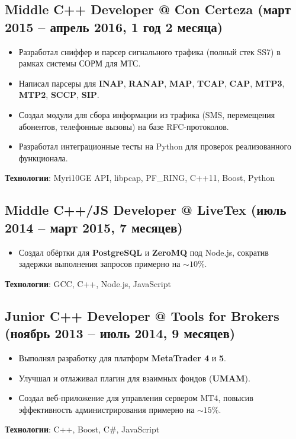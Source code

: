 \documentclass[a4paper,12pt]{article}
\begin{document}
\subsection*{Middle C++ Developer @ Con Certeza \quad (март 2015 – апрель 2016, 1 год 2 месяца)}
\begin{itemize}[leftmargin=15pt]
    \item Разработал сниффер и парсер сигнального трафика (полный стек SS7) в рамках системы СОРМ для МТС.
    \item Написал парсеры для \textbf{INAP}, \textbf{RANAP}, \textbf{MAP}, \textbf{TCAP}, \textbf{CAP}, \textbf{MTP3}, \textbf{MTP2}, \textbf{SCCP}, \textbf{SIP}.
    \item Создал модули для сбора информации из трафика (SMS, перемещения абонентов, телефонные вызовы) на базе RFC-протоколов.
    \item Разработал интеграционные тесты на Python для проверок реализованного функционала.
\end{itemize}

\textbf{Технологии}: Myri10GE API, libpcap, PF\_RING, C++11, Boost, Python

\vspace{3mm}

\subsection*{Middle C++/JS Developer @ LiveTex \quad (июль 2014 – март 2015, 7 месяцев)}
\begin{itemize}[leftmargin=15pt]
    \item Создал обёртки для \textbf{PostgreSQL} и \textbf{ZeroMQ} под Node.js, сократив задержки выполнения запросов примерно на \(\sim 10\%\).
\end{itemize}

\textbf{Технологии}: GCC, C++, Node.js, JavaScript

\vspace{3mm}

\subsection*{Junior C++ Developer @ Tools for Brokers \quad (ноябрь 2013 – июль 2014, 9 месяцев)}
\begin{itemize}[leftmargin=15pt]
    \item Выполнял разработку для платформ \textbf{MetaTrader 4} и \textbf{5}.
    \item Улучшал и отлаживал плагин для взаимных фондов (\textbf{UMAM}).
    \item Создал веб-приложение для управления сервером MT4, повысив эффективность администрирования примерно на \(\sim 15\%\).
\end{itemize}

\textbf{Технологии}: C++, Boost, C\#, JavaScript
\end{document}
